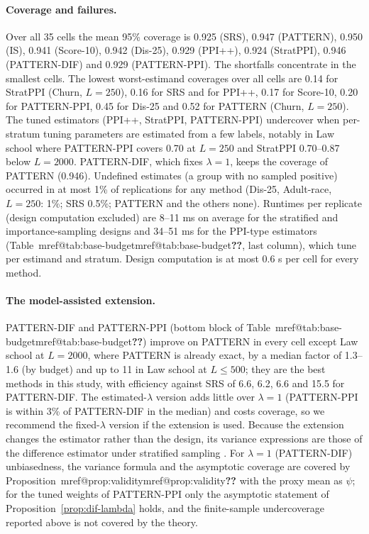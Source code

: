 \documentclass[pdflatex,sn-mathphys-num,iicol]{sn-jnl}
\makeatletter
\theoremstyle{thmstyleone}
\theoremstyle{thmstyletwo}
\theoremstyle{thmstylethree}
\newcommand{\Mref}[1]{\ifcsname mref@#1\endcsname\csname mref@#1\endcsname\else\textbf{??}\fi}
\makeatother
\begin{document}
\paragraph{Coverage and failures.} Over all 35 cells the mean 95\% coverage is 0.925 (SRS), 0.947 (PATTERN), 0.950 (IS), 0.941 (Score-10), 0.942 (Dis-25), 0.929 (PPI++), 0.924 (StratPPI), 0.946 (PATTERN-DIF) and 0.929 (PATTERN-PPI). The shortfalls concentrate in the smallest cells. The lowest worst-estimand coverages over all cells are 0.14 for StratPPI (Churn, $L=250$), 0.16 for SRS and for PPI++, 0.17 for Score-10, 0.20 for PATTERN-PPI, 0.45 for Dis-25 and 0.52 for PATTERN (Churn, $L=250$). The tuned estimators (PPI++, StratPPI, PATTERN-PPI) undercover when per-stratum tuning parameters are estimated from a few labels, notably in Law school where PATTERN-PPI covers 0.70 at $L=250$ and StratPPI 0.70--0.87 below $L=2000$. PATTERN-DIF, which fixes $\lambda=1$, keeps the coverage of PATTERN (0.946). Undefined estimates (a group with no sampled positive) occurred in at most 1\% of replications for any method (Dis-25, Adult-race, $L=250$: 1\%; SRS 0.5\%; PATTERN and the others none). Runtimes per replicate (design computation excluded) are 8--11 ms on average for the stratified and importance-sampling designs and 34--51 ms for the PPI-type estimators (Table~\Mref{tab:base-budget}, last column), which tune per estimand and stratum. Design computation is at most 0.6 s per cell for every method.

\paragraph{The model-assisted extension.} PATTERN-DIF and PATTERN-PPI (bottom block of Table~\Mref{tab:base-budget}) improve on PATTERN in every cell except Law school at $L=2000$, where PATTERN is already exact, by a median factor of 1.3--1.6 (by budget) and up to 11 in Law school at $L\le500$; they are the best methods in this study, with efficiency against SRS of 6.6, 6.2, 6.6 and 15.5 for PATTERN-DIF. The estimated-$\lambda$ version adds little over $\lambda=1$ (PATTERN-PPI is within 3\% of PATTERN-DIF in the median) and costs coverage, so we recommend the fixed-$\lambda$ version if the extension is used. Because the extension changes the estimator rather than the design, its variance expressions are those of the difference estimator under stratified sampling \citep{sarndal1992}. For $\lambda=1$ (PATTERN-DIF) unbiasedness, the variance formula and the asymptotic coverage are covered by Proposition~\Mref{prop:validity} with the proxy mean as $\psi$; for the tuned weights of PATTERN-PPI only the asymptotic statement of Proposition~\ref{prop:dif-lambda} holds, and the finite-sample undercoverage reported above is not covered by the theory.
\end{document}
